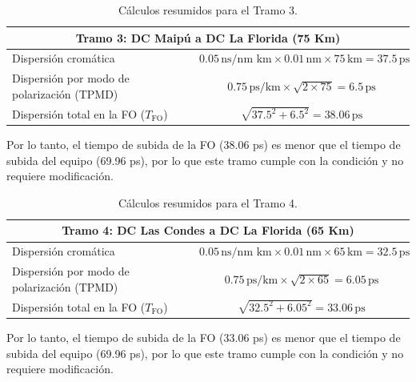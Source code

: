 \begin{itemize}
\begin{table}[H]
	\centering
	\renewcommand{\arraystretch}{1.5}
	\begin{tabular}{|l|c|}
		\hline
		\multicolumn{2}{|c|}{\textbf{Tramo 3: DC Maipú a DC La Florida (75 Km)}} \\ \hline
		Dispersión cromática                      & $0.05 \, \text{ns/nm km} \times 0.01 \, \text{nm} \times 75 \, \text{km} = 37.5 \, \text{ps}$ \\ \hline
		Dispersión por modo de polarización (TPMD) & $0.75 \, \text{ps/km} \times \sqrt{2 \times 75} = 6.5 \, \text{ps}$ \\ \hline
		Dispersión total en la FO (\(T_{\text{FO}}\)) & $\sqrt{37.5^2 + 6.5^2} = 38.06 \, \text{ps}$ \\ \hline
	\end{tabular}
	\caption{Cálculos resumidos para el Tramo 3.}
\end{table}

Por lo tanto, el tiempo de subida de la FO (38.06 ps) es menor que el tiempo de subida del equipo (69.96 ps), por lo que este tramo cumple con la condición y no requiere modificación.

\begin{table}[H]
	\centering
	\renewcommand{\arraystretch}{1.5}
	\begin{tabular}{|l|c|}
		\hline
		\multicolumn{2}{|c|}{\textbf{Tramo 4: DC Las Condes a DC La Florida (65 Km)}} \\ \hline
		Dispersión cromática                      & $0.05 \, \text{ns/nm km} \times 0.01 \, \text{nm} \times 65 \, \text{km} = 32.5 \, \text{ps}$ \\ \hline
		Dispersión por modo de polarización (TPMD) & $0.75 \, \text{ps/km} \times \sqrt{2 \times 65} = 6.05 \, \text{ps}$ \\ \hline
		Dispersión total en la FO (\(T_{\text{FO}}\)) & $\sqrt{32.5^2 + 6.05^2} = 33.06 \, \text{ps}$ \\ \hline
	\end{tabular}
	\caption{Cálculos resumidos para el Tramo 4.}
\end{table}

Por lo tanto, el tiempo de subida de la FO (33.06 ps) es menor que el tiempo de subida del equipo (69.96 ps), por lo que este tramo cumple con la condición y no requiere modificación.


\end{itemize}
